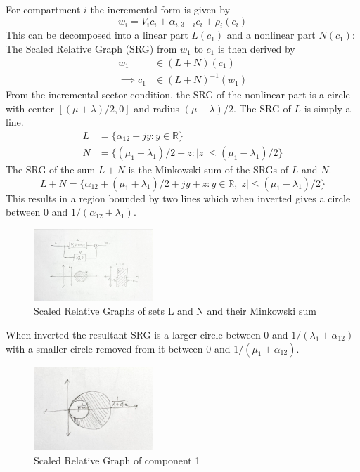 \documentclass{article}
\begin{document}
For compartment $i$ the incremental form is given by
\begin{equation}
    w_i = V_i \dot{c}_i + \alpha_{i,3-i} c_i + \rho_i(c_i)
\end{equation}
This can be decomposed into a linear part $L(c_1)$ and a nonlinear part $N(c_1)$:
The Scaled Relative Graph (SRG) from $w_1$ to $c_1$ is then derived by
\begin{align}
    w_1 &\in (L + N)(c_1) \\
    \implies c_1 &\in (L + N)^{-1}(w_1) 
\end{align}
From the incremental sector condition, the SRG of the nonlinear part is a circle with center $[(\mu+\lambda)/2, 0]$ and radius $(\mu-\lambda)/2$.
The SRG of $L$ is simply a line.
\begin{align}
    L &= \{ \alpha_{12} + j y : y \in \mathbb{R} \} \\
    N &= \{ (\mu_1 + \lambda_1)/2 + z : |z| \leq (\mu_1 - \lambda_1)/2 \}
\end{align}
The SRG of the sum $L + N$ is the Minkowski sum of the SRGs of $L$ and $N$.
\begin{equation}
    L + N = \{ \alpha_{12} + (\mu_1 + \lambda_1)/2 + jy + z : y \in \mathbb{R}, |z| \leq (\mu_1 - \lambda_1)/2 \}
\end{equation}
This results in a region bounded by two lines which when inverted gives a circle between 0 and $1/(\alpha_{12} + \lambda_1)$.

\begin{figure}[H]
    \centering
    \includegraphics[width=0.4\textwidth]{figures/componentSRGs.jpg}
    \caption{Scaled Relative Graphs of sets L and N and their Minkowski sum}
\end{figure}
When inverted the resultant SRG is a larger circle between 0 and $1/(\lambda_1 + \alpha_{12})$ with a smaller circle removed from it between 0 and $1/(\mu_1 + \alpha_{12})$.
\begin{figure}[H]
    \centering
    \includegraphics[width=0.4\textwidth]{figures/compartmentSRG.jpg}
    \caption{Scaled Relative Graph of component 1}
\end{figure}
\end{document}
